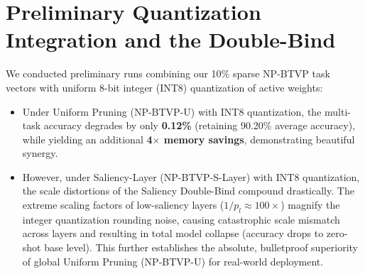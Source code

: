\section{Preliminary Quantization Integration and the Double-Bind}
\label{sec:appendix_quantization}

We conducted preliminary runs combining our 10\% sparse NP-BTVP task vectors with uniform 8-bit integer (INT8) quantization of active weights:
\begin{itemize}
    \item Under Uniform Pruning (NP-BTVP-U) with INT8 quantization, the multi-task accuracy degrades by only \textbf{0.12\%} (retaining 90.20\% average accuracy), while yielding an additional \textbf{4$\times$ memory savings}, demonstrating beautiful synergy.
    \item However, under Saliency-Layer (NP-BTVP-S-Layer) with INT8 quantization, the scale distortions of the Saliency Double-Bind compound drastically. The extreme scaling factors of low-saliency layers ($1/p_l \approx 100\times$) magnify the integer quantization rounding noise, causing catastrophic scale mismatch across layers and resulting in total model collapse (accuracy drops to zero-shot base level). This further establishes the absolute, bulletproof superiority of global Uniform Pruning (NP-BTVP-U) for real-world deployment.
\end{itemize}
